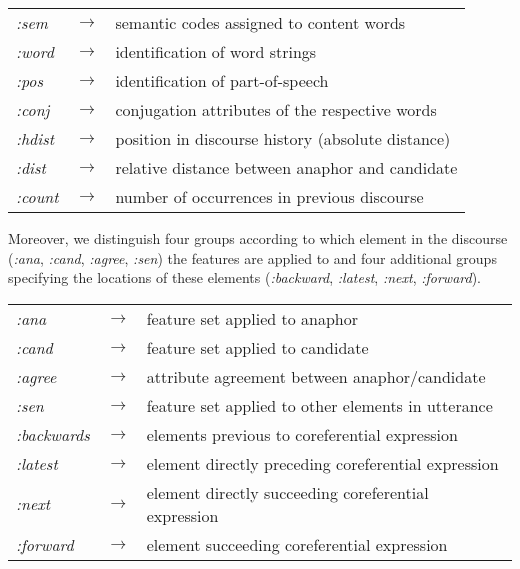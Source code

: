 \renewcommand{\arraystretch}{}
\begin{center}
\begin{tabular}{lll}
  {\em :sem}   & $\rightarrow$ & semantic codes assigned to content words \\
  {\em :word}  & $\rightarrow$ & identification of word strings\\
  {\em :pos}   & $\rightarrow$ & identification of part-of-speech\\
  {\em :conj}  & $\rightarrow$ & conjugation attributes of the respective words\\
  {\em :hdist} & $\rightarrow$ & position in discourse history (absolute distance) \\
  {\em :dist}  & $\rightarrow$ & relative distance between anaphor and candidate \\
  {\em :count} & $\rightarrow$ & number of occurrences in previous discourse \\
\end{tabular}
\end{center}
Moreover, we distinguish four groups according to which element in the discourse
({\em :ana}, {\em :cand}, {\em :agree}, {\em :sen}) the features are applied to 
and four additional groups specifying the locations of these elements
({\em :backward}, {\em :latest}, {\em :next}, {\em :forward}).

\begin{center}
\begin{tabular}{lll}
  {\em :ana}   & $\rightarrow$ & feature set applied to anaphor \\
  {\em :cand}  & $\rightarrow$ & feature set applied to candidate \\
  {\em :agree} & $\rightarrow$ & attribute agreement between anaphor/candidate \\
  {\em :sen}   & $\rightarrow$ & feature set applied to other elements in utterance \\[0.5em]
  {\em :backwards} & $\rightarrow$ & elements previous to coreferential expression \\
  {\em :latest}    & $\rightarrow$ & element directly preceding coreferential expression \\
  {\em :next}      & $\rightarrow$ & element directly succeeding coreferential expression \\
  {\em :forward}   & $\rightarrow$ & element succeeding coreferential expression
\end{tabular}
\end{center}
\renewcommand{\arraystretch}{}

